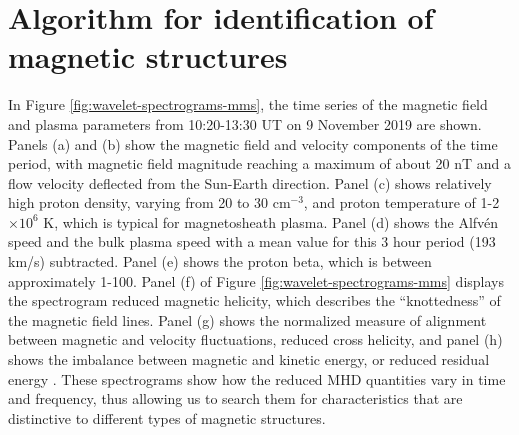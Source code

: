 \section{Algorithm for identification of magnetic structures} \label{sec:wavelet-algorithm}
In Figure \ref{fig:wavelet-spectrograms-mms}, the time series of the magnetic field and plasma parameters from 10:20-13:30 UT on 9 November 2019 are shown. Panels (a) and (b) show the magnetic field and velocity components of the time period, with magnetic field magnitude reaching a maximum of about 20 nT and a flow velocity deflected from the Sun-Earth direction. Panel (c) shows relatively high proton density, varying from 20 to 30 cm$^{-3}$, and proton temperature of 1-2$\times 10^{6}$ K, which is typical for magnetosheath plasma. Panel (d) shows the Alfv\'en speed and the bulk plasma speed with a mean value for this 3 hour period (193 km/s) subtracted. Panel (e) shows the proton beta, which is between approximately 1-100. Panel (f) of Figure \ref{fig:wavelet-spectrograms-mms} displays the spectrogram reduced magnetic helicity, which describes the “knottedness” of the magnetic field lines. Panel (g) shows the normalized measure of alignment between magnetic and velocity fluctuations, reduced cross helicity, and panel (h) shows the imbalance between magnetic and kinetic energy, or reduced residual energy \citep{Matthaeus:1982}. These spectrograms show how the reduced MHD quantities vary in time and frequency, thus allowing us to search them for characteristics that are distinctive to different types of magnetic structures.


